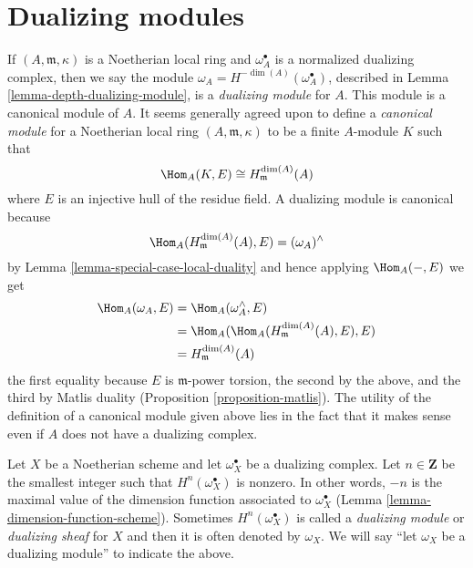 \section{Dualizing modules}
\label{section-dualizing-module}

\noindent
If $(A, \mathfrak m, \kappa)$ is a Noetherian local ring and
$\omega_A^\bullet$ is a normalized dualizing complex, then
we say the module $\omega_A = H^{-\dim(A)}(\omega_A^\bullet)$, described
in Lemma \ref{lemma-depth-dualizing-module}, is a {\it dualizing module}
for $A$. This module is a canonical module of $A$.
It seems generally agreed upon to define a {\it canonical module}
for a Noetherian local ring $(A, \mathfrak m, \kappa)$ to be
a finite $A$-module $K$ such that
$$
\Hom_A(K, E) \cong H^{\dim(A)}_\mathfrak m(A)
$$
where $E$ is an injective hull of the residue field. A dualizing
module is canonical because
$$
\Hom_A(H^{\dim(A)}_\mathfrak m(A), E) = (\omega_A)^\wedge
$$
by Lemma \ref{lemma-special-case-local-duality} and hence applying
$\Hom_A(-, E)$ we get
\begin{align*}
\Hom_A(\omega_A, E)
& =
\Hom_A(\omega_A^\wedge, E) \\
& =
\Hom_A(\Hom_A(H^{\dim(A)}_\mathfrak m(A), E), E) \\
& = H^{\dim(A)}_\mathfrak m(A)
\end{align*}
the first equality because $E$ is $\mathfrak m$-power torsion, the
second by the above, and the third by Matlis duality
(Proposition \ref{proposition-matlis}). The utility of the definition
of a canonical module given above lies in the fact that it makes sense
even if $A$ does not have a dualizing complex.

\medskip\noindent
Let $X$ be a Noetherian scheme and let $\omega_X^\bullet$ be a
dualizing complex. Let $n \in \mathbf{Z}$ be the smallest integer such that
$H^n(\omega_X^\bullet)$ is nonzero. In other words, $-n$ is the maximal
value of the dimension function associated to $\omega_X^\bullet$
(Lemma \ref{lemma-dimension-function-scheme}).
Sometimes $H^n(\omega_X^\bullet)$
is called a {\it dualizing module} or {\it dualizing sheaf}
for $X$ and then it is often denoted
by $\omega_X$. We will say ``let $\omega_X$ be a dualizing module''
to indicate the above.

